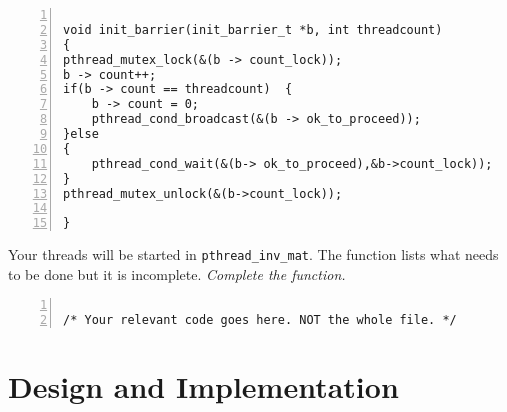 \documentclass{article}
\begin{document}
\begin{lstlisting}[basicstyle=\small\sffamily,
keywords={break,case,const,continue,default,else,enum,
for,if,return,switch,while,do,long,void,int,float,double,
char,struct,typedef,include,size\_t},
keywordstyle={\color{blue}},
comment={[l]{//}}, morecomment={[s]{/*}{*/}}, commentstyle=\itshape,
columns={[l]flexible}, numbers=left, numberstyle=\tiny,
frameround=fftt, frame=shadowbox, captionpos=b,
caption={Your barrier implementation.},
label=LST:barrier]

void init_barrier(init_barrier_t *b, int threadcount)
{
pthread_mutex_lock(&(b -> count_lock));
b -> count++;
if(b -> count == threadcount)  { 
	b -> count = 0;
	pthread_cond_broadcast(&(b -> ok_to_proceed));
}else 
{
	pthread_cond_wait(&(b-> ok_to_proceed),&b->count_lock));
}
pthread_mutex_unlock(&(b->count_lock));

}
\end{lstlisting}

\begin{ExerciseList}
  \Exercise Your threads will be started in
  \texttt{pthread\_inv\_mat}. The function lists what needs to be done
  but it is incomplete.
  \Question \emph{Complete the function.}
\end{ExerciseList}

\begin{lstlisting}[basicstyle=\small\sffamily,
keywords={break,case,const,continue,default,else,enum,
for,if,return,switch,while,do,long,void,int,float,double,
char,struct,typedef,include,size\_t},
keywordstyle={\color{blue}},
comment={[l]{//}}, morecomment={[s]{/*}{*/}}, commentstyle=\itshape,
columns={[l]flexible}, numbers=left, numberstyle=\tiny,
frameround=fftt, frame=shadowbox, captionpos=b,
caption={Function \texttt{pthread\_inv\_mat}.},
label=LST:pinvmat]

/* Your relevant code goes here. NOT the whole file. */
\end{lstlisting}


\section{Design and Implementation}
\end{document}
